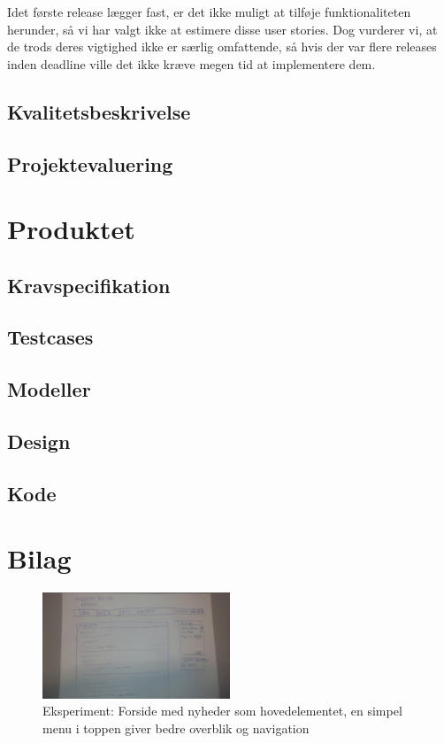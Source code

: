 \documentclass[12pt, a4paper]{report}
\begin{document}
Idet første release lægger fast, er det ikke muligt at tilføje funktionaliteten herunder, så vi har valgt ikke at estimere disse user stories. Dog vurderer vi, at de trods deres vigtighed ikke er særlig omfattende, så hvis der var flere releases inden deadline ville det ikke kræve megen tid at implementere dem.

\section{Kvalitetsbeskrivelse}


\section{Projektevaluering}


\chapter{Produktet}
\section{Kravspecifikation}

\section{Testcases}

\section{Modeller}


\section{Design}


\section{Kode}

\chapter{Bilag}

\begin{figure}
\includegraphics[width=0.5\textwidth]{eksperiment_forside}
\caption{Eksperiment: Forside med nyheder som hovedelementet, en simpel menu i toppen giver bedre overblik og navigation}
\label{e_forside}
\end{figure}
\end{document}
